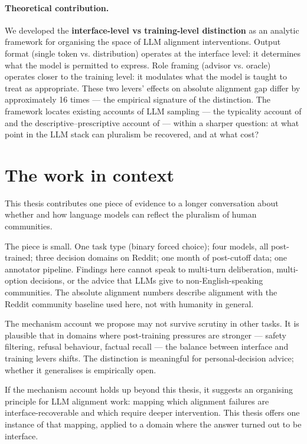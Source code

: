 \paragraph{Theoretical contribution.}
We developed the \textbf{interface-level vs training-level
distinction} as an analytic framework for organising the space of
LLM alignment interventions. Output format (single token vs.
distribution) operates at the interface level: it determines what the
model is permitted to express. Role framing (advisor vs. oracle)
operates closer to the training level: it modulates what the model is
taught to treat as appropriate. These two levers' effects on
absolute alignment gap differ by approximately 16 times --- the
empirical signature of the distinction. The framework locates existing accounts of LLM
sampling --- the typicality account of
\citet{zhang-2025-verbalized-sampling} and the descriptive--prescriptive
account of \citet{sivaprasad-2025-descriptive-prescriptive} ---
within a sharper question: at what point in the LLM stack can
pluralism be recovered, and at what cost?

\section{The work in context}
\label{sec:conc_context}

This thesis contributes one piece of evidence to a longer conversation
about whether and how language models can reflect the pluralism of
human communities.

The piece is small. One task type (binary forced choice); four
models, all post-trained; three decision domains on Reddit; one month
of post-cutoff data; one annotator pipeline. Findings here cannot
speak to multi-turn deliberation, multi-option decisions, or the
advice that LLMs give to non-English-speaking communities. The
absolute alignment numbers describe alignment with the Reddit
community baseline used here, not with humanity in general.

The mechanism account we propose may not survive scrutiny in other
tasks. It is plausible that in domains where post-training pressures
are stronger --- safety filtering, refusal behaviour, factual
recall --- the balance between interface and training levers shifts.
The distinction is meaningful for personal-decision advice; whether it
generalises is empirically open.

If the mechanism account holds up beyond this thesis, it suggests an
organising principle for LLM alignment work: mapping which alignment
failures are interface-recoverable and which require deeper
intervention. This thesis offers one instance of that mapping,
applied to a domain where the answer turned out to be interface.

